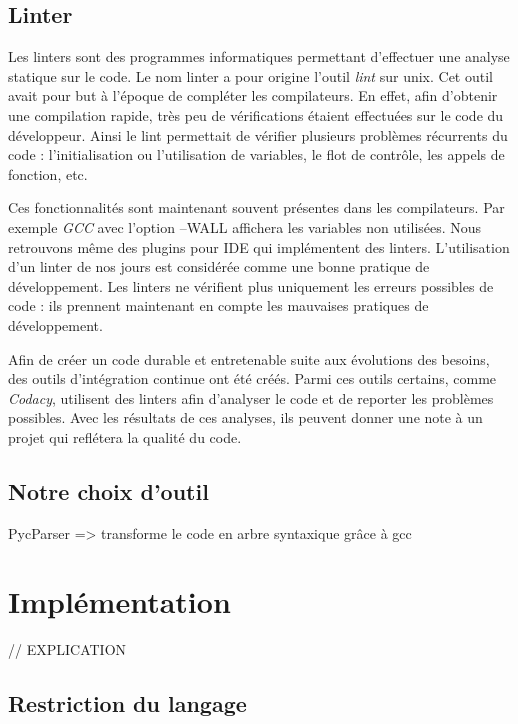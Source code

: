 \documentclass[12pt, twoside, openright]{report}
\begin{document}
\section{Linter}
Les linters sont des programmes informatiques permettant d'effectuer une analyse statique sur le code. Le nom linter a pour origine l'outil \textit{lint} sur unix. Cet outil avait pour but à l'époque de compléter les compilateurs. En effet, afin d'obtenir une compilation rapide, très peu de vérifications étaient effectuées sur le code du développeur. Ainsi le lint permettait de vérifier plusieurs problèmes récurrents du code : l'initialisation ou l'utilisation de variables, le flot de contrôle, les appels de fonction, etc. \cite{linter01}

Ces fonctionnalités sont maintenant souvent présentes dans les compilateurs. Par exemple \textit{GCC} avec l'option --WALL affichera les variables non utilisées. Nous retrouvons même des plugins pour IDE qui implémentent des linters. L'utilisation d'un linter de nos jours est considérée comme une bonne pratique de développement. Les linters ne vérifient plus uniquement les erreurs possibles de code : ils prennent maintenant en compte les mauvaises pratiques de développement.  

Afin de créer un code durable et entretenable suite aux évolutions des besoins, des outils d'intégration continue ont été créés. Parmi ces outils certains, comme \textit{Codacy}, utilisent des linters afin d'analyser le code et de reporter les problèmes possibles. Avec les résultats de ces analyses, ils peuvent donner une note à un projet qui reflétera la qualité du code.   

\section{Notre choix d'outil}

PycParser => transforme le code en arbre syntaxique grâce à gcc

\chapter{Implémentation}

// EXPLICATION

\section{Restriction du langage}
\end{document}
